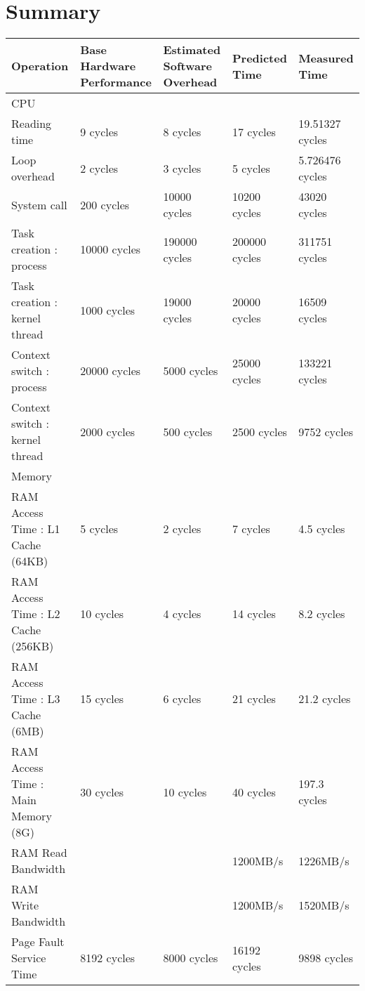 \chapter{Summary}

\small
\begin{center}
\begin{tabular}{| p{4cm} | p{2.5cm} | p{2.5cm} | p{2.5cm} | p{2.5cm} |}
\hline
Operation  & Base Hardware Performance  & Estimated Software Overhead  & Predicted Time  & Measured Time   \\
\hline 
CPU & & & & \\
\hline
Reading time & 9 cycles & 8 cycles & 17 cycles & 19.51327 cycles \\
Loop overhead & 2 cycles& 3 cycles& 5 cycles& 5.726476 cycles\\
System call & 200 cycles& 10000 cycles& 10200 cycles& 43020 cycles \\
Task creation : process & 10000 cycles& 190000 cycles& 200000 cycles& 311751 cycles \\
Task creation : kernel thread    & 1000 cycles& 19000 cycles& 20000 cycles& 16509 cycles\\
Context switch : process & 20000 cycles& 5000 cycles& 25000 cycles& 133221  cycles\\
Context switch : kernel thread    & 2000 cycles& 500 cycles& 2500 cycles& 9752 cycles\\
\hline 
Memory & & & & \\
\hline
RAM Access Time : L1 Cache (64KB) &   5 cycles  & 2 cycles & 7 cycles &  4.5 cycles \\
RAM Access Time : L2 Cache (256KB) & 10 cycles & 4 cycles & 14 cycles &  8.2 cycles\\
RAM Access Time : L3 Cache (6MB) & 15 cycles & 6 cycles & 21 cycles  & 21.2 cycles\\
RAM Access Time : Main Memory (8G) & 30 cycles & 10 cycles & 40 cycles & 197.3 cycles\\
RAM Read Bandwidth & & & 1200MB/s & 1226MB/s \\
RAM Write Bandwidth & & & 1200MB/s & 1520MB/s \\
Page Fault Service Time & 8192 cycles& 8000 cycles& 16192 cycles& 9898 cycles\\
\end{tabular}
\end{center}



